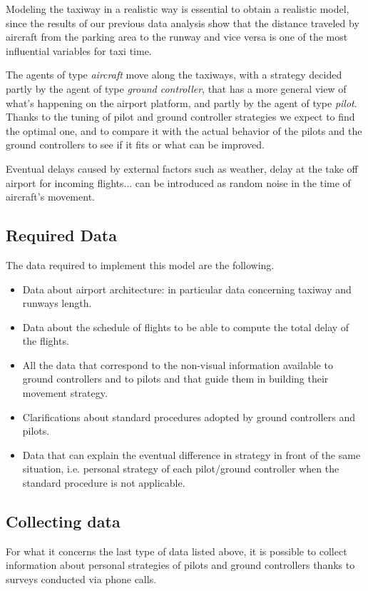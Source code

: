 \documentclass{article}
\begin{document}
Modeling the taxiway in a realistic way is essential to obtain a realistic model, since the results of our previous data analysis show that the distance traveled by aircraft from the parking area to the runway and vice versa is one of the most influential variables for taxi time.

The agents of type \textit{aircraft} move along the taxiways, with a strategy decided partly by the agent of type \textit{ground controller}, that has a more general view of what's happening on the airport platform, and partly by the agent of type \textit{pilot}. Thanks to the tuning of pilot and ground controller strategies we expect to find the optimal one, and to compare it with the actual behavior of the pilots and the ground controllers to see if it fits or what can be improved.

Eventual delays caused by external factors such as weather, delay at the take off airport for incoming flights... can be introduced as random noise in the time of aircraft's movement.
\subsection{Required Data}
The data required to implement this model are the following.
\begin{itemize}
	\item Data about airport architecture: in particular data concerning taxiway and runways length.
	\item Data about the schedule of flights to be able to compute the total delay of the flights.
	\item All the data that correspond to the non-visual information available to ground controllers and to pilots and that guide them in building their movement strategy.
	\item Clarifications about standard procedures adopted by ground controllers and pilots.
	\item Data that can explain the eventual difference in strategy in front of the same situation, i.e. personal strategy of each pilot/ground controller when the standard procedure is not applicable.
\end{itemize}
\subsection{Collecting data}
For what it concerns the last type of data listed above, it is possible to collect information about personal strategies of pilots and ground controllers thanks to surveys conducted via phone calls.
\end{document}
